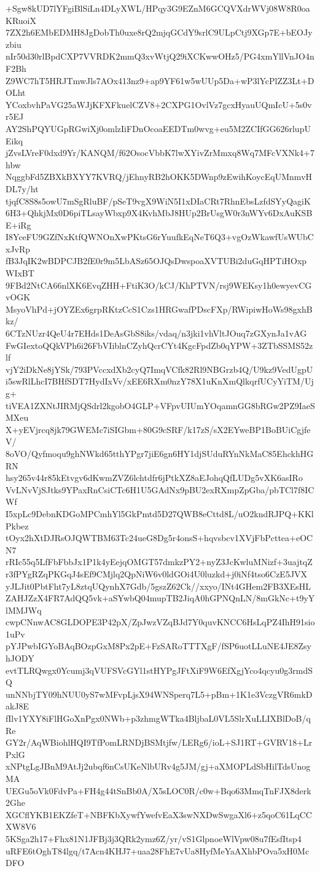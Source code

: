 +Sgw8kUD7lYFgiBlSiLn4DLyXWL/HPqy3G9EZnM6GCQVXdrWVj08W8R0oaKRuoiX
7ZX2h6EMbEDMH8JgDobTh0uxe8rQ2mjqGCdY9srlC9ULpCtj9XGp7E+bEOJyzbiu
nIr50d30rlBpdCXP7VVRDK2mmQ3xvWtjQ29iXCKwwOHz5/PG4xmYllVnJO4nF2Bh
Z9WC7hT5HRJTmwJls7AOx413nz9+ap9YF61w5wUUp5Da+wP3lYcPlZZ3Lt+DOLht
YCoxbvhPaVG25aWJjKFXFkuelCZV8+2CXPG1OvlVz7gcxHyauUQmIcU+5s0vr5EJ
AY2ShPQYUGpRGwiXj0omlzIiFDnOcoaEEDTm0wvg+eu5M2ZCIfGG626rlupUEikq
jZvsLVreF0dxd9Yr/KANQM/f62OsocVbbK7lwXYivZrMmxq8Wq7MFcVXNk4+7hbw
NqggbFd5ZBXkBXYY7KVRQ/jEhnyRB2hOKK5DWnp9zEwihKoycEqUMnmvHDL7y/ht
tjqfC8S8s5owU7mSgRluBF/pSeT9vgX9WiN5I1xDIaCRt7RhnEbsLzfdSYyQagiK
6H3+QhkjMx0D6piTLsayWbxp9X4KvhMbJ8HUp2BrUsgW0r3nWYv6DxAuKSBE+iRg
I8YceFU9GZfNxKtfQWNOnXwPKtsG6rYuufkEqNeT6Q3+vgOzWkawfUsWUbCxJvRp
fB3JqIK2wBDPCJB2fE0r9m5LbASz65OJQsDwspoaXVTUBi2duGqHPTiHOxpWIxBT
9FBd2NtCA66nlXK6EvqZHH+FtiK3O/kCJ/KhPTVN/rsj9WEKsy1h0ewyevCGvOGK
MsyoVhPd+jOYZEx6grpRKtzCcS1Czs1HRGwafPDscFXp/RWipiwHoWs98gxhBkz/
6CTzNUzr4QeU4r7EHds1DeAsGbS8iks/vdaq/n3jki1vhVltJOuq7zGXynJa1vAG
FwGIextoQQkVPh6i26FbVIiblnCZyhQcrCYt4KgcFpdZb0qYPW+3ZTbSSMS52zlf
vjY2iDkNe8jYSk/793PVccxdXb2cyQ7ImqVCfk82Rl9NBGrzb4Q/U9kz9VedUgpU
i5swRlLhcI7BHfSDT7HydIxVv/xEE6RXm0nzY78X1uKnXmQlkqrfUCyYiTM/Ujg+
tiVEA1ZXNtJIRMjQSdrl2kgobO4GLP+VFpvUIUmYOqamnGG8bRGw2PZ9IaeSMXeu
X+yEVjrcq8jk79GWEMc7iSIGbm+80G9cSRF/k17zS/sX2EYweBP1BoBUiCgjfeV/
8oVO/Qyfmoqu9ghNWkd65tthYPgr7jiE6gn6HY1djSUduRYnNkMaC85EhckhHGRN
hsy265v44r85kEtvgv6dKwmZVZ6lchtdfr6jPtkXZ8aEJohqQfLUDg5vXK6asIRo
VvLNvVjSJtks9YPaxRnCsiCTc6H1U5GAdNx9pBU2exRXmpZpGba/pbTCl7f8ICWf
I5xpLc9DebnKDGoMPCmhYl5GkPmtd5D27QWB8eCttd8L/uO2kndRJPQ+KKlPkbez
tOyx2hXtDJRsOJQWTBM63Tc24ueG8Dg5r4onsS+hqvsbcv1XVjFbPcttea+eOCN7
rRIc55q5LfFbFbbJx1P1k4yEejqOMGT57dmkzPY2+nyZ3JcKwluMNizf+3uajtqZ
r3fPYgRZqPKGqJ4sEf9CMjlq2QpNiW6v0ldGOi4U0luzkd+j0iNf4tso6CzE5JVX
yJLJit0PbtFht7yL8ztqUQynhX7Gdb/5gszZ62Ck//xxyo/INt4GHem2FB3XEsHL
ZAHJZzX4FR7AdQQ5vk+aSYwbQ04mupTB2JiqA0hGPNQnLN/8mGkNc+t9yYlMMJWq
cwpCNnwAC8GLDOPE3P42pX/ZpJwzVZqBJd7Y0quvKNCC6HsLqPZ4IhH91sio1uPv
pYJPwbIGYoBAqBOzpGxM8Px2pE+FzSARoTTTXgF/fSP6uotLLuNE4JE8ZsyhJODY
evtTLRQwgx0Ycumj3qVUFSVcGYl1stHYPgJFtXiF9W6EfXgjYco4qcyu0g3rmdSQ
unNNbjTY09hNUU0yS7wMFvpLjsX94WNSperq7L5+pBm+1K1e3VczgVR6mkDakJ8E
fIlv1YXY8iFlHGoXnPgx0NWb+p3zhmgWTka4BljbaL0VL5SlrXuLLIXBlDoB/qRe
GY2r/AqWBiohlHQI9TfPomLRNDjBSMtjfw/LERg6/ioL+SJ1RT+GVRV18+LrPxlG
xNPtgLgJBnM9AtJj2ubqf6nCsUKeNlbURv4g5JM/gj+aXMOPLdSbHilTdsUnogMA
UEGu5oVk0FdvPa+FH4g44tSnBb0A/X5sLOC0R/c0w+Bqo63MmqTnFJX8derk2Ghe
XGCflYKB1EKZfeT+NBFKbXywfYwefvEaX3swNXDwSwgaXl6+z5qoC61LqCCXW8V6
5KSga2h17+Fhx81N1JFBj3j3QRk2ymz6Z/yr/vS1GlpnoeWlVpw08u7fEsfItsp4
uRFE6tOghT84lgq/t7Acn4KHJ7+uaa28FhE7vUa8HyfMeYaAXhbPOva5xH0McDFO

